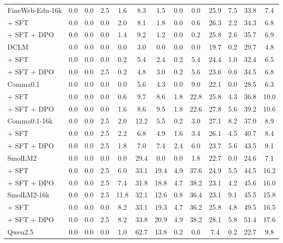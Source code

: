 \begin{table}[ht]
\begin{tabular}{lcccccccccccc}
\midrule
\addlinespace[0.3em]
FineWeb-Edu-16k & 0.0 & 0.0 & 2.5 & 1.6 & 8.3 & 1.5 & 0.0 & 0.0 & 25.9 & 7.5 & 33.8 & 7.4 \\
\quad + SFT & 0.0 & 0.0 & 0.0 & 2.0 & 8.1 & 1.8 & 0.0 & 0.6 & 26.3 & 2.2 & 34.3 & 6.8 \\
\quad + SFT + DPO & 0.0 & 0.0 & 0.0 & 1.4 & 9.2 & 1.2 & 0.0 & 0.2 & 25.8 & 2.6 & 35.7 & 6.9 \\
\midrule
\addlinespace[0.3em]
DCLM & 0.0 & 0.0 & 0.0 & 0.0 & 3.0 & 0.0 & 0.0 & 0.0 & 19.7 & 0.2 & 29.7 & 4.8 \\
\quad + SFT & 0.0 & 0.0 & 0.0 & 0.2 & 5.4 & 2.4 & 0.2 & 5.4 & 24.4 & 1.0 & 32.4 & 6.5 \\
\quad + SFT + DPO & 0.0 & 0.0 & 2.5 & 0.2 & 4.8 & 3.0 & 0.2 & 5.6 & 23.6 & 0.6 & 34.5 & 6.8 \\
\midrule
\addlinespace[0.3em]
Comma0.1 & 0.0 & 0.0 & 0.0 & 0.0 & 5.6 & 4.3 & 0.0 & 9.0 & 22.1 & 0.0 & 28.5 & 6.3 \\
\quad + SFT & 0.0 & 0.0 & 0.0 & 0.6 & 9.7 & 8.6 & 1.8 & 22.8 & 25.8 & 4.3 & 36.8 & 10.0 \\
\quad + SFT + DPO & 0.0 & 0.0 & 0.0 & 1.6 & 8.6 & 9.5 & 1.8 & 22.6 & 27.8 & 5.6 & 39.2 & 10.6 \\
\midrule
\addlinespace[0.3em]
Comma0.1-16k & 0.0 & 0.0 & 2.5 & 2.0 & 12.2 & 5.5 & 0.2 & 3.0 & 27.1 & 8.2 & 37.0 & 8.9 \\
\quad + SFT & 0.0 & 0.0 & 2.5 & 2.2 & 6.8 & 4.9 & 1.6 & 3.4 & 26.1 & 4.5 & 40.7 & 8.4 \\
\quad + SFT + DPO & 0.0 & 0.0 & 2.5 & 1.8 & 7.0 & 7.4 & 2.4 & 6.0 & 23.7 & 5.6 & 43.5 & 9.1 \\
\midrule
\addlinespace[0.3em]
SmolLM2 & 0.0 & 0.0 & 0.0 & 0.0 & 29.4 & 0.0 & 0.0 & 1.8 & 22.7 & 0.0 & 24.6 & 7.1 \\
\quad + SFT & 0.0 & 0.0 & 2.5 & 6.0 & 33.1 & 19.4 & 4.9 & 37.6 & 24.9 & 5.5 & 44.5 & 16.2 \\
\quad + SFT + DPO & 0.0 & 0.0 & 2.5 & 7.4 & 31.8 & 18.8 & 4.7 & 38.2 & 23.1 & 4.2 & 45.6 & 16.0 \\
\midrule
\addlinespace[0.3em]
SmolLM2-16k & 0.0 & 0.0 & 2.5 & 11.8 & 32.1 & 12.6 & 0.8 & 36.4 & 23.1 & 9.1 & 45.5 & 15.8 \\
\quad + SFT & 0.0 & 0.0 & 0.0 & 8.2 & 33.1 & 19.3 & 4.7 & 36.2 & 25.8 & 4.8 & 49.5 & 16.5 \\
\quad + SFT + DPO & 0.0 & 0.0 & 2.5 & 8.2 & 33.8 & 20.9 & 4.9 & 38.2 & 28.1 & 5.8 & 51.4 & 17.6 \\
\midrule
\addlinespace[0.3em]
Qwen2.5 & 0.0 & 0.0 & 0.0 & 1.0 & 62.7 & 13.8 & 0.2 & 0.0 & 7.4 & 0.2 & 22.7 & 9.8 \\

\end{tabular}
\end{table}
